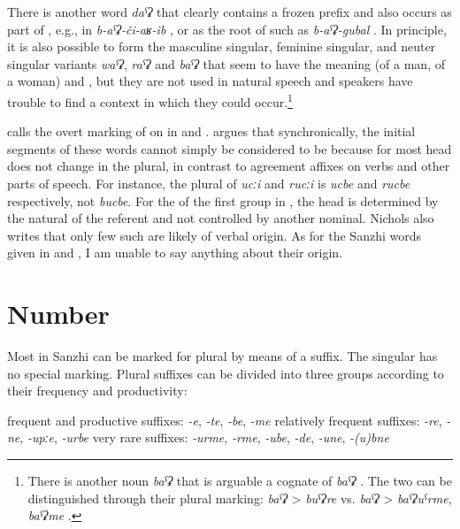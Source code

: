 There is another word \textit{daˁʡ}  that clearly contains a frozen  prefix and also occurs as part of , e.g., in \textit{b-aˁʡ-či-aʁ-ib} , or as the root of  such as \textit{b-aˁʡ-gubal} . In principle, it is also possible to form the masculine singular, feminine singular, and neuter singular variants \textit{waˁʡ}, \textit{raˁʡ} and \textit{baˁʡ} that seem to have the meaning  (of a man, of a woman) and , but they are not used in natural speech and speakers have trouble to find a context in which they could occur.\footnote{There is another noun \textit{baˁʡ}  that is arguable a cognate of \textit{baˁʡ} . The two  can be distinguished through their plural marking: \textit{baˁʡ} > \textit{buˁʡre}  vs. \textit{baˁʡ} > \textit{baˁʡuˁrme}, \textit{baˁʡme} .}

\citet{Nichols2007} calls the overt marking of  on  in  and  . \citet{Nichols2007} argues that synchronically, the initial segments of these words cannot simply be considered to be   because for most  head  does not change in the plural, in contrast to agreement affixes on verbs and other parts of speech. For instance, the plural of \textit{ucːi}  and \textit{rucːi}  is \textit{ucbe} and \textit{rucbe} respectively, not \textit{bucbe}. For the  of the first group in , the head  is determined by the natural  of the referent and not controlled by another nominal. Nichols also writes that only few such  are likely of verbal origin. As for the Sanzhi words given in  and , I am unable to say anything about their origin.



\section{Number}
\label{sec:nounnumber}

Most  in Sanzhi can be marked for plural by means of a suffix. The singular has no special marking. Plural suffixes can be divided into three groups according to their frequency and productivity:
%
\begin{exe}
	\ex	\label{ex:pluralsuffixes}
	\begin{xlist}
		\ex	frequent and productive suffixes: 	\tab	\textit{-e}, \textit{-te}, \textit{-be}, \textit{-me} 
		\ex	relatively frequent suffixes: 		\tab	\textit{-re}, \textit{-ne}, \textit{-upːe}, \textit{-urbe} 
		\ex	very rare suffixes: 				\tab	\textit{-urme}, \textit{-rme}, \textit{-ube}, \textit{-de}, \textit{-une}, \textit{-(u)bne}
	\end{xlist}
\end{exe}

